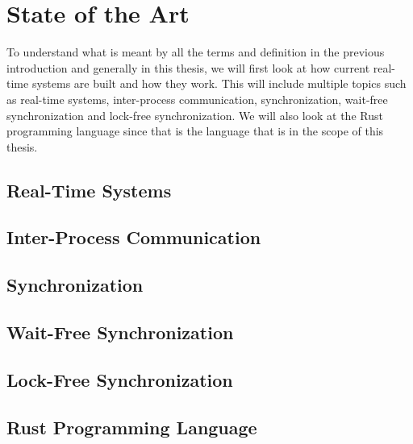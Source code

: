 \chapter{State of the Art}

To understand what is meant by all the terms and definition in the previous introduction and generally in this thesis, we will first look at how current real-time systems are built and how they work. This will include multiple topics such as real-time systems, inter-process communication, synchronization, wait-free synchronization and lock-free synchronization. We will also look at the Rust programming language since that is the language that is in the scope of this thesis.

\section{Real-Time Systems}

\section{Inter-Process Communication}

\section{Synchronization}

\section{Wait-Free Synchronization}

\section{Lock-Free Synchronization}

\section{Rust Programming Language}